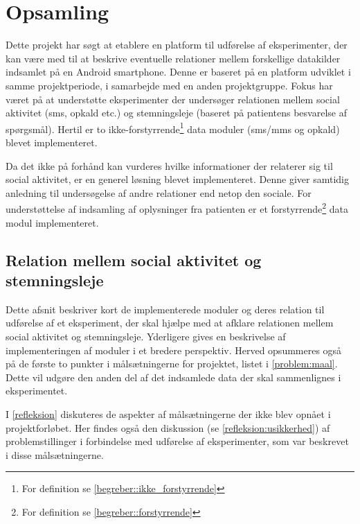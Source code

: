 \chapter{Opsamling}
Dette projekt har søgt at etablere en platform til udførelse af eksperimenter, der kan være med til at beskrive eventuelle relationer mellem forskellige datakilder indsamlet på en Android smartphone.
Denne er baseret på en platform\citefaelles{} udviklet i samme projektperiode, i samarbejde med en anden projektgruppe.
Fokus har været på at understøtte eksperimenter der undersøger relationen mellem social aktivitet (sms, opkald etc.) og stemningsleje (baseret på patientens besvarelse af spørgsmål).
Hertil er to ikke-forstyrrende\footnote{For definition se \cref{begreber::ikke_forstyrrende}} data moduler (sms/mms og opkald) blevet implementeret.

Da det ikke på forhånd kan vurderes hvilke informationer der relaterer sig til social aktivitet, er en generel løsning blevet implementeret.
Denne giver samtidig anledning til undersøgelse af andre relationer end netop den sociale.
For understøttelse af indsamling af oplysninger fra patienten er et forstyrrende\footnote{For definition se \cref{begreber::forstyrrende}} data modul implementeret.


\section{Relation mellem social aktivitet og stemningsleje}
Dette afsnit beskriver kort de implementerede moduler og deres relation til udførelse af et eksperiment, der skal hjælpe med at afklare relationen mellem social aktivitet og stemningsleje.
Yderligere gives en beskrivelse af implementeringen af moduler i et bredere perspektiv.
Herved opsummeres også på de første to punkter i målsætningerne for projektet, listet i \cref{problem:maal}.
Dette vil udgøre den anden del af det indsamlede data der skal sammenlignes i eksperimentet.

I \cref{refleksion} diskuteres de aspekter af målsætningerne der ikke blev opnået i projektforløbet.
Her findes også den diskussion (se \cref{refleksion:usikkerhed}) af problemstillinger i forbindelse med udførelse af eksperimenter, som var beskrevet i disse målsætningerne.

